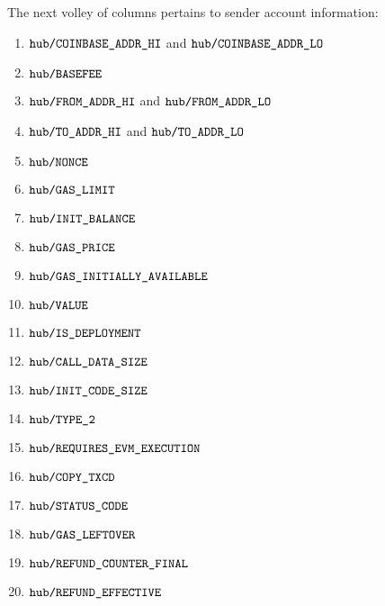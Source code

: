 The next volley of columns pertains to sender account information:
\begin{enumerate}
	\item
		\markAsExtractedFromBtc{}
		$\txnDataHubCoinbaseHi$ and
		$\txnDataHubCoinbaseLo$
	\item
		\markAsExtractedFromBtc{}
		$\txnDataHubBasefee$
	\item
		\markAsExtractedFromEcrecover{}
		$\txnDataHubFromHi$ and
		$\txnDataHubFromLo$
	\item
		\markAsSometimesExtractedFromRlpTxn{}
		$\txnDataHubToHi$ and
		$\txnDataHubToLo$
	\item
		\markAsExtractedFromRlpTxn{}
		$\txnDataHubNonce$
	\item
		\markAsExtractedFromRlpTxn{}
		$\txnDataHubGasLimit$
	\item
		\markAsExtractedFromHub{}
		$\txnDataHubInitialBalance$
	\item
		\markAsJustifiedHere{}
		$\txnDataHubGasPrice$
	\item
		\markAsJustifiedHere{}
		$\txnDataHubInitialGas$
	\item
		\markAsExtractedFromRlpTxn{}
		$\txnDataHubValue$
	\item
		\markAsExtractedFromRlpTxn{}
		$\txnDataHubIsDeployment$
	\item
		\markAsJustifiedHere{}
		$\txnDataHubCallDataSize$
	\item
		\markAsJustifiedHere{}
		$\txnDataHubInitCodeSize$
	\item
		\markAsJustifiedHere{}
		$\txnDataHubIsTypeTwo$
	\item
		$\txnDataHubRequiresEvmExecution$
	\item
		$\txnDataHubCopyTxcd$
	\item
		\markAsExtractedFromHub{}
		\godGiven{}
		$\txnDataHubStatusCode$
	\item
		\markAsExtractedFromHub{}
		$\txnDataHubLeftoverGas$
	\item
		\markAsExtractedFromHub{}
		$\txnDataHubFinalRefundCounter$
	\item
		\markAsJustifiedHere{}
		$\txnDataHubEffectiveRefund$
\end{enumerate}

